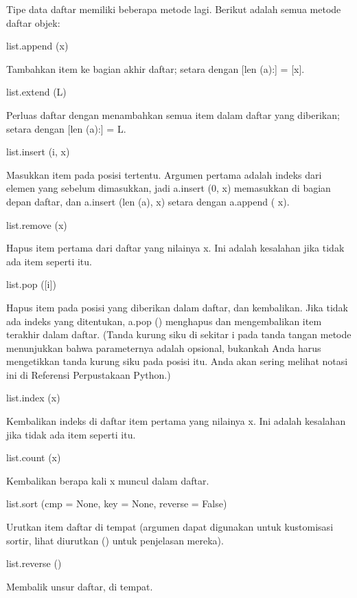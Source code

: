 \vspace{12pt}
Tipe data daftar memiliki beberapa metode lagi. Berikut adalah semua metode daftar objek: \par
\vspace{12pt}
\noindent 
list.append (x) \par
\noindent 
Tambahkan item ke bagian akhir daftar; setara dengan [len (a):] = [x]. \par
\vspace{12pt}
\noindent 
list.extend (L) \par
\noindent 
Perluas daftar dengan menambahkan semua item dalam daftar yang diberikan; setara dengan [len (a):] = L. \par
\vspace{12pt}
\noindent 
list.insert (i, x) \par
\noindent 
Masukkan item pada posisi tertentu. Argumen pertama adalah indeks dari elemen yang sebelum dimasukkan, jadi a.insert (0, x) memasukkan di bagian depan daftar, dan a.insert (len (a), x) setara dengan a.append ( x). \par
\vspace{12pt}
\noindent 
list.remove (x) \par
\noindent 
Hapus item pertama dari daftar yang nilainya x. Ini adalah kesalahan jika tidak ada item seperti itu. \par
\vspace{12pt}
\noindent 
list.pop ([i]) \par
\noindent 
Hapus item pada posisi yang diberikan dalam daftar, dan kembalikan. Jika tidak ada indeks yang ditentukan, a.pop () menghapus dan mengembalikan item terakhir dalam daftar. (Tanda kurung siku di sekitar i pada tanda tangan metode menunjukkan bahwa parameternya adalah opsional, bukankah Anda harus mengetikkan tanda kurung siku pada posisi itu. Anda akan sering melihat notasi ini di Referensi Perpustakaan Python.) \par
\vspace{12pt}
\noindent 
list.index (x) \par
\noindent 
Kembalikan indeks di daftar item pertama yang nilainya x. Ini adalah kesalahan jika tidak ada item seperti itu. \par
\vspace{12pt}
\noindent 
list.count (x) \par
\noindent 
Kembalikan berapa kali x muncul dalam daftar. \par
\vspace{12pt}
\noindent 
list.sort (cmp = None, key = None, reverse = False) \par
\noindent 
Urutkan item daftar di tempat (argumen dapat digunakan untuk kustomisasi sortir, lihat diurutkan () untuk penjelasan mereka). \par
\vspace{12pt}
\noindent 
list.reverse () \par
\noindent 
Membalik unsur daftar, di tempat. \par

